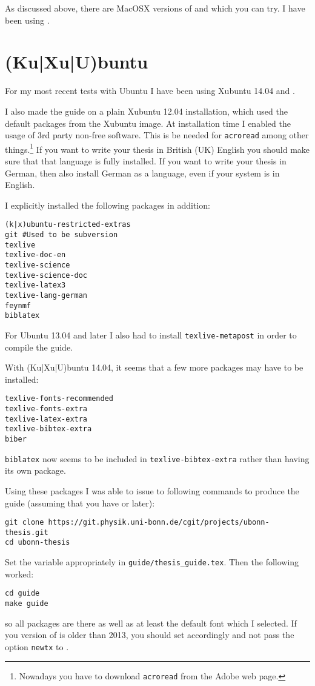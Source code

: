 As discussed above, there are MacOSX versions of \TeXstudio and \TeXmaker which you can try.
I have been using \TeXstudio.


\section{(Ku|Xu|U)buntu}
\label{sec:app:kubuntu}

For my most recent tests with Ubuntu I have been using Xubuntu 14.04 and 
.

I also made the guide on a plain Xubuntu 12.04
installation, which used the default packages from the Xubuntu image. At
installation time I enabled the usage of 3rd party non-free
software. This is be needed for \texttt{acroread} among other
things.\footnote{Nowadays you have to download \texttt{acroread} from
  the Adobe web page.} 
If you want to write your thesis in British (UK) English you should make sure
that that language is fully installed. If you want to write your
thesis in German, then also install German as a language, even if
your system is in English.

I explicitly installed the following packages in addition:
\begin{verbatim}
(k|x)ubuntu-restricted-extras
git #Used to be subversion
texlive
texlive-doc-en
texlive-science
texlive-science-doc
texlive-latex3
texlive-lang-german
feynmf
biblatex
\end{verbatim}
For Ubuntu 13.04 and later I also had to install \texttt{texlive-metapost} in
order to compile the guide.

With (Ku|Xu|U)buntu 14.04, it seems that a few more packages may have to be installed:
\begin{verbatim}
texlive-fonts-recommended
texlive-fonts-extra
texlive-latex-extra
texlive-bibtex-extra
biber
\end{verbatim}
\texttt{biblatex} now seems to be included in \texttt{texlive-bibtex-extra} rather than having its own package.

\noindent
Using these packages I was able to issue to following commands to
produce the guide (assuming that you have  or later):
\begin{verbatim}
git clone https://git.physik.uni-bonn.de/cgit/projects/ubonn-thesis.git
cd ubonn-thesis
\end{verbatim}
Set the  variable appropriately in \texttt{guide/thesis\_guide.tex}.
Then the following worked:
\begin{verbatim}
cd guide
make guide
\end{verbatim}
so all packages are there as well as at least the default font which I
selected. If you version of \TeXLive is older than 2013, you should set
 accordingly and not pass the option \texttt{newtx} to .


